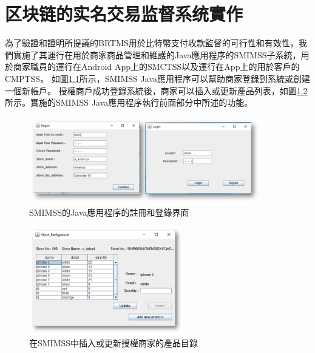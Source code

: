 
\chapter{区块链的实名交易监督系统實作}
為了驗證和證明所提議的BRTMS用於比特幣支付收款監督的可行性和有效性，我們實施了其運行在用於商家商品管理和維護的Java應用程序的SMIMSS子系統，用於商家職員的運行在Android App上的SMCTSS以及運行在App上的用於客戶的CMPTSS。
如圖\ref{fig5}所示，SMIMSS Java應用程序可以幫助商家登錄到系統或創建一個新帳戶。 授權商戶成功登錄系統後，商家可以插入或更新產品列表，如圖\ref{fig6}所示。實施的SMIMSS Java應用程序執行前面部分中所述的功能。
\begin{figure}[h]
	\centering
	\includegraphics[width = 0.9\textwidth]{fig5.png}
	\caption{SMIMSS的Java應用程序的註冊和登錄界面}\label{fig5}
\end{figure}
\begin{figure}[h]
	\centering
	\includegraphics[width = 0.6\textwidth]{fig6.png}
	\caption{在SMIMSS中插入或更新授權商家的產品目錄}\label{fig6}
\end{figure}


